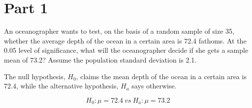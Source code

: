 \section{Part 1}
    An oceanographer wants to test, on the basis of a random sample of size 35, whether the average depth of the ocean in a certain area is 72.4 fathoms. At the 0.05 level of significance, what will the oceanographer decide if she gets a sample mean of 73.2? Assume the population standard deviation is 2.1.\n


    The null hypothesis, $H_{0}$, claims the mean depth of the ocean in a certain area is 72.4, while the alternative hypothesis, $H_{a}$ says otherwise.

        \[ H_{0}: \mu = 72.4 \ vs \ H_{a}: \mu = 73.2 \]
